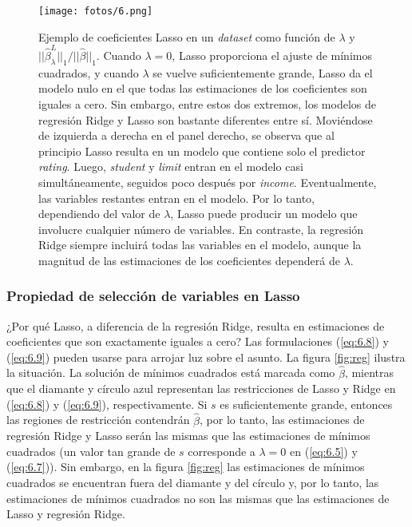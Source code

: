 \begin{figure}[h]
\centering
\texttt{[image: fotos/6.png]}
\caption{Ejemplo de coeficientes Lasso en un \textit{dataset} como función de $\lambda$ y $||\hat{\beta}_\lambda^L||_1 / ||\hat{\beta}||_1$. Cuando $\lambda = 0$, Lasso proporciona el ajuste de mínimos cuadrados, y cuando $\lambda$ se vuelve suficientemente grande, Lasso da el modelo nulo en el que todas las estimaciones de los coeficientes son iguales a cero. Sin embargo, entre estos dos extremos, los modelos de regresión Ridge y Lasso son bastante diferentes entre sí. Moviéndose de izquierda a derecha en el panel derecho, se observa que al principio Lasso resulta en un modelo que contiene solo el predictor \textit{rating}. Luego, \textit{student} y \textit{limit} entran en el modelo casi simultáneamente, seguidos poco después por \textit{income}. Eventualmente, las variables restantes entran en el modelo. Por lo tanto, dependiendo del valor de $\lambda$, Lasso puede producir un modelo que involucre cualquier número de variables. En contraste, la regresión Ridge siempre incluirá todas las variables en el modelo, aunque la magnitud de las estimaciones de los coeficientes dependerá de $\lambda$.}
\label{fig:6.6}
\end{figure}

\subsubsection{Propiedad de selección de variables en Lasso}

¿Por qué Lasso, a diferencia de la regresión Ridge, resulta en estimaciones de coeficientes que son exactamente iguales a cero? Las formulaciones (\ref{eq:6.8}) y (\ref{eq:6.9}) pueden usarse para arrojar luz sobre el asunto. La figura \ref{fig:reg} ilustra la situación. La solución de mínimos cuadrados está marcada como $\hat{\beta}$, mientras que el diamante y círculo azul representan las restricciones de Lasso y Ridge en (\ref{eq:6.8}) y (\ref{eq:6.9}), respectivamente. Si $s$ es suficientemente grande, entonces las regiones de restricción contendrán $\hat{\beta}$, por lo tanto, las estimaciones de regresión Ridge y Lasso serán las mismas que las estimaciones de mínimos cuadrados (un valor tan grande de $s$ corresponde a $\lambda = 0$ en (\ref{eq:6.5}) y (\ref{eq:6.7})). Sin embargo, en la figura \ref{fig:reg} las estimaciones de mínimos cuadrados se encuentran fuera del diamante y del círculo y, por lo tanto, las estimaciones de mínimos cuadrados no son las mismas que las estimaciones de Lasso y regresión Ridge. \\

